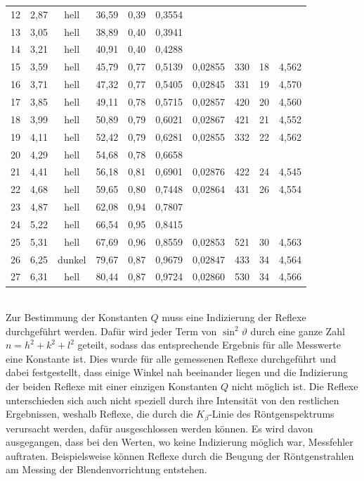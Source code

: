 \documentclass[a4paper,twoside,final]{article}
\begin{document}
\begin{table}[ht]
\begin{tabular}{l c c c c c | c c c c}
12 & 2,87 & hell      & 36,59 & 0,39 & 0,3554 &         &     &    &       \\
13 & 3,05 & hell      & 38,89 & 0,40 & 0,3941 &         &     &    &       \\
14 & 3,21 & hell      & 40,91 & 0,40 & 0,4288 &         &     &    &       \\
15 & 3,59 & hell      & 45,79 & 0,77 & 0,5139 & 0,02855 & 330 & 18 & 4,562 \\
16 & 3,71 & hell      & 47,32 & 0,77 & 0,5405 & 0,02845 & 331 & 19 & 4,570 \\
17 & 3,85 & hell      & 49,11 & 0,78 & 0,5715 & 0,02857 & 420 & 20 & 4,560 \\
18 & 3,99 & hell      & 50,89 & 0,79 & 0,6021 & 0,02867 & 421 & 21 & 4,552 \\
19 & 4,11 & hell      & 52,42 & 0,79 & 0,6281 & 0,02855 & 332 & 22 & 4,562 \\
20 & 4,29 & hell      & 54,68 & 0,78 & 0,6658 &         &     &    &       \\
21 & 4,41 & hell      & 56,18 & 0,81 & 0,6901 & 0,02876 & 422 & 24 & 4,545 \\
22 & 4,68 & hell      & 59,65 & 0,80 & 0,7448 & 0,02864 & 431 & 26 & 4,554 \\
23 & 4,87 & hell      & 62,08 & 0,94 & 0,7807 &         &     &    &       \\
24 & 5,22 & hell      & 66,54 & 0,95 & 0,8415 &         &     &    &       \\
25 & 5,31 & hell      & 67,69 & 0,96 & 0,8559 & 0,02853 & 521 & 30 & 4,563 \\
26 & 6,25 & dunkel    & 79,67 & 0,87 & 0,9679 & 0,02847 & 433 & 34 & 4,564 \\
27 & 6,31 & hell      & 80,44 & 0,87 & 0,9724 & 0,02860 & 530 & 34 & 4,566
	\end{tabular}
\end{table}\\
Zur Bestimmung der Konstanten $Q$ muss eine Indizierung der Reflexe durchgeführt werden. Dafür wird jeder Term von $\sin^2 \vartheta $ durch eine ganze Zahl $n = h^2 + k^2 + l^2$ geteilt, sodass das entsprechende Ergebnis für alle Messwerte eine Konstante ist. Dies wurde für alle gemessenen Reflexe durchgeführt und dabei festgestellt, dass einige Winkel nah beeinander liegen und die Indizierung der beiden Reflexe mit einer einzigen Konstanten $Q$ nicht möglich ist. Die Reflexe unterschieden sich auch nicht speziell durch ihre Intensität von den restlichen Ergebnissen, weshalb Reflexe, die durch die $K_\beta$-Linie des Röntgenspektrums verursacht werden, dafür ausgeschlossen werden können. Es wird davon ausgegangen, dass bei den Werten, wo keine Indizierung möglich war, Messfehler auftraten. Beispielsweise können Reflexe durch die Beugung der Röntgenstrahlen am Messing der Blendenvorrichtung entstehen.
\end{document}
